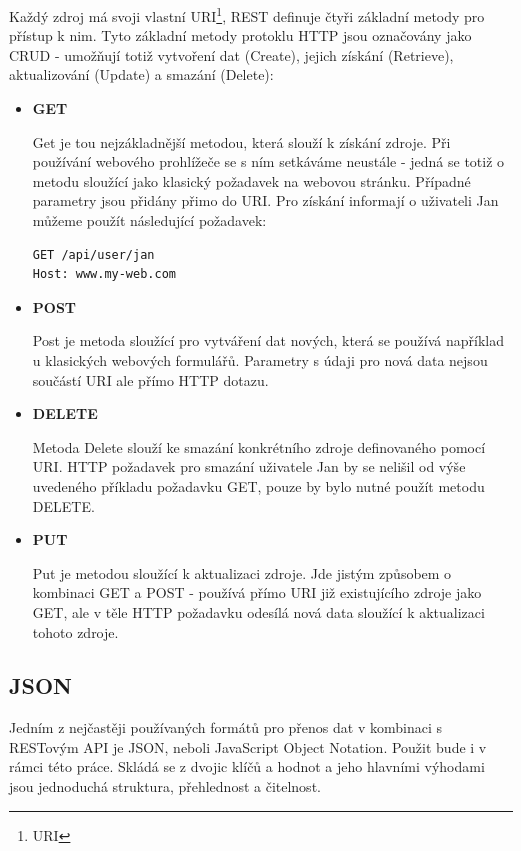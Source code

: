\documentclass[thesis=B,czech]{FITthesis}[2012/06/26]
\begin{document}
	Každý zdroj má svoji vlastní URI\footnote{URI}, REST definuje čtyři základní metody pro přístup k nim. Tyto základní metody protoklu HTTP jsou označovány jako CRUD - umožňují totiž vytvoření dat (Create), jejich získání (Retrieve), aktualizování (Update) a smazání (Delete):
\begin{itemize}

\item\textbf{GET}

Get je tou nejzákladnější metodou, která slouží k získání zdroje. Při používání webového prohlížeče se s ním setkáváme neustále - jedná se totiž o metodu sloužící jako klasický požadavek na webovou stránku. Případné parametry jsou přidány přimo do URI. Pro získání informají o uživateli Jan můžeme použít následující požadavek: 
\begin{lstlisting}[frame=single]
GET /api/user/jan
Host: www.my-web.com
\end{lstlisting}

\item\textbf{POST}

Post je metoda sloužící pro vytváření dat nových, která se používá například u klasických webových formulářů. Parametry s údaji pro nová data nejsou součástí URI ale přímo HTTP dotazu. 

\item\textbf{DELETE}

Metoda Delete slouží ke smazání konkrétního zdroje definovaného pomocí URI. HTTP požadavek pro smazání uživatele Jan by se nelišil od výše uvedeného příkladu požadavku GET, pouze by bylo nutné použít metodu DELETE. 

\item\textbf{PUT}

Put je metodou sloužící k aktualizaci zdroje. Jde jistým způsobem o kombinaci GET a POST - používá přímo URI již existujícího zdroje jako GET, ale v těle HTTP požadavku odesílá nová data sloužící k aktualizaci tohoto zdroje. 

\end{itemize}

	
\subsection{JSON}	
	Jedním z nejčastěji používaných formátů pro přenos dat v kombinaci s RESTovým API je JSON, neboli JavaScript Object Notation. Použit bude i v rámci této práce. Skládá se z dvojic klíčů a hodnot a jeho hlavními výhodami jsou jednoduchá struktura, přehlednost a čitelnost. 
	
\end{document}
